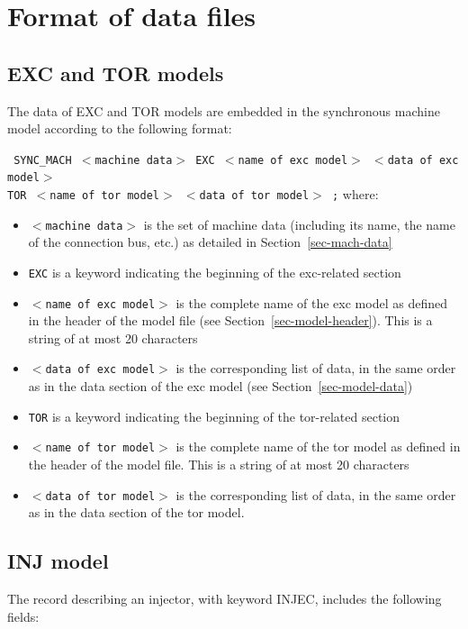 \section{Format of data files}


\subsection{EXC and TOR models}

The data of EXC and TOR models are embedded in the synchronous machine model according to the following format:

{\tt \hspace*{5ex} SYNC\_MACH $<$machine data$>$ EXC $<$name of exc model$>$ $<$data of exc model$>$ \\
\hspace*{10ex} TOR $<$name of tor model$>$ $<$data of tor model$>$ ;}
where:
\begin{itemize}
\item {\tt $<$machine data$>$} is the set of machine data (including its name, the name of the connection bus, etc.) as detailed in Section~\ref{sec-mach-data}
\item {\tt EXC} is a keyword indicating the beginning of the exc-related section
\item {\tt $<$name of exc model$>$} is the complete name of the exc model as defined in the header of the model file (see Section~\ref{sec-model-header}). This is a string of at most 20 characters
\item {\tt $<$data of exc model$>$} is the corresponding list of data, in the same order as in the data section of the exc model (see Section~\ref{sec-model-data})
\item {\tt TOR} is a keyword indicating the beginning of the tor-related section
\item {\tt $<$name of tor model$>$} is the complete name of the tor model as defined in the header of the model file. This is a string of at most 20 characters
\item {\tt $<$data of tor model$>$} is the corresponding list of data, in the same order as in the data section of the tor model.
\end{itemize}

\subsection{INJ model}

The record describing an injector, with keyword INJEC, includes the following fields:

